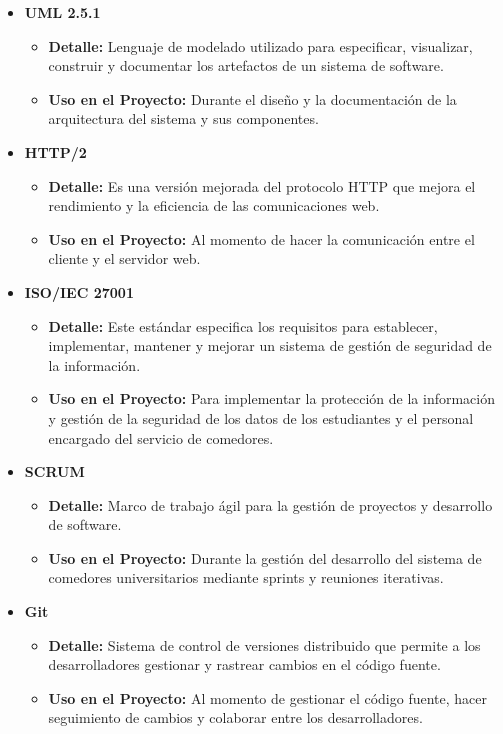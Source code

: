 \documentclass[stu, 12pt, letterpaper, donotrepeattitle, floatsintext, natbib]{apa7}
\begin{document}
\begin{itemize}
	\item \textbf{UML 2.5.1}
	\begin{itemize}
		\item \textbf{Detalle:} Lenguaje de modelado utilizado para especificar, visualizar, construir y documentar los artefactos de un sistema de software.
		\item \textbf{Uso en el Proyecto:} Durante el diseño y la documentación de la arquitectura del sistema y sus componentes.
	\end{itemize}
	
	\item \textbf{HTTP/2}
	\begin{itemize}
		\item \textbf{Detalle:} Es una versión mejorada del protocolo HTTP que mejora el rendimiento y la eficiencia de las comunicaciones web.
		\item \textbf{Uso en el Proyecto:} Al momento de hacer la comunicación entre el cliente y el servidor web.
	\end{itemize}
	
	\item \textbf{ISO/IEC 27001}
	\begin{itemize}
		\item \textbf{Detalle:} Este estándar especifica los requisitos para establecer, implementar, mantener y mejorar un sistema de gestión de seguridad de la información.
		\item \textbf{Uso en el Proyecto:} Para implementar la protección de la información y gestión de la seguridad de los datos de los estudiantes y el personal encargado del servicio de comedores.
	\end{itemize}
	
	\item \textbf{SCRUM}
	\begin{itemize}
		\item \textbf{Detalle:} Marco de trabajo ágil para la gestión de proyectos y desarrollo de software.
		\item \textbf{Uso en el Proyecto:} Durante la gestión del desarrollo del sistema de comedores universitarios mediante sprints y reuniones iterativas.
	\end{itemize}
	
	\item \textbf{Git}
	\begin{itemize}
		\item \textbf{Detalle:} Sistema de control de versiones distribuido que permite a los desarrolladores gestionar y rastrear cambios en el código fuente.
		\item \textbf{Uso en el Proyecto:} Al momento de gestionar el código fuente, hacer seguimiento de cambios y colaborar entre los desarrolladores.
	\end{itemize}
	

\end{itemize}
\end{document}
